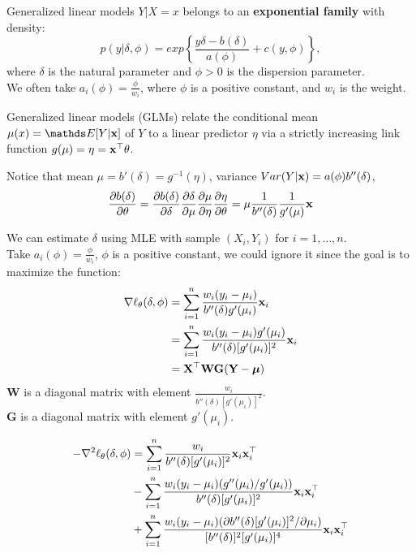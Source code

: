 \documentclass[11pt,compress,t,notes=noshow, xcolor=table]{beamer}
\begin{document}
\begin{vbframe}{Generalized linear models}
$Y|X=x$ belongs to an \textbf{exponential family} with density:
$$ p(y|\delta, \phi) = exp \left\{ \frac{y\delta-b(\delta)}{a(\phi)} + c(y,\phi) \right\}, $$
where $\delta$ is the natural parameter and $\phi > 0$ is the dispersion parameter.\\
We often take $a_i(\phi) = \frac{\phi}{w_i}$, where $\phi$ is a positive constant, and $w_i$ is the weight.

\lz

Generalized linear models (GLMs) relate the conditional mean $\mu(x)=\E[Y|\xv]$ of $Y$ to a linear predictor $\eta$ via a 
strictly increasing link function $g(\mu)=\eta=\mathbf{x}^\top\theta$.\\

\lz

Notice that mean $\mu=b'(\delta)=g^{-1}(\eta)$, variance $Var(Y|\mathbf{x})=a(\phi)b''(\delta)$, \\
$$\frac{\partial{b(\delta)}}{\partial{\theta}}
=\frac{\partial{b(\delta)}}{\partial{\delta}}\frac{\partial{\delta}}{\partial{\mu}}\frac{\partial{\mu}}{\partial{\eta}}\frac{\partial{\eta}}{\partial{\theta}}
=\mu \frac{1}{b''(\delta)} \frac{1}{g'(\mu)} \mathbf{x}$$

\framebreak
We can estimate $\delta$ using MLE with sample $(X_i,Y_i)$ for $i=1,\ldots,n$.\\
Take $a_i(\phi) = \frac{\phi}{w_i}$, $\phi$ is a positive constant, 
we could ignore it since the goal is to maximize the function:\\
\begin{align*}
\nabla \ell_{\theta}(\delta, \phi) &= \sum\limits_{i=1}^n \frac{w_i(y_i-\mu_i)}{b''(\delta)g'(\mu_i)}\mathbf{x}_i\\
 &= \sum\limits_{i=1}^n \frac{w_i(y_i-\mu_i)g'(\mu_i)}{b''(\delta)[g'(\mu_i)]^2}\mathbf{x}_i\\
 &= \mathbf{X}^\top \mathbf{W} \mathbf{G} (\mathbf{Y}-\bm{\mu})
\end{align*}
\lz
$\mathbf{W}$ is a diagonal matrix with element $\frac{w_i}{b''(\delta)[g'(\mu_i)]^2}$.\\
$\mathbf{G}$ is a diagonal matrix with element $g'(\mu_i)$.\\

\framebreak

\begin{align*}
-\nabla^2 \ell_{\theta}(\delta, \phi)
  & = \sum\limits_{i=1}^n \frac{w_i}{b''(\delta)[g'(\mu_i)]^2}\mathbf{x}_i\mathbf{x}_i^\top \\
  & - \sum\limits_{i=1}^n \frac{w_i(y_i-\mu_i)(g''(\mu_i)/g'(\mu_i))}{b''(\delta)[g'(\mu_i)]^2}\mathbf{x}_i\mathbf{x}_i^\top \\ 
  & + \sum\limits_{i=1}^n \frac{w_i(y_i-\mu_i)(\partial{b''(\delta)[g'(\mu_i)]^2}/\partial{\mu_i})}{[b''(\delta)]^2[g'(\mu_i)]^4}\mathbf{x}_i\mathbf{x}_i^\top
\end{align*}


\end{vbframe}
\end{document}
